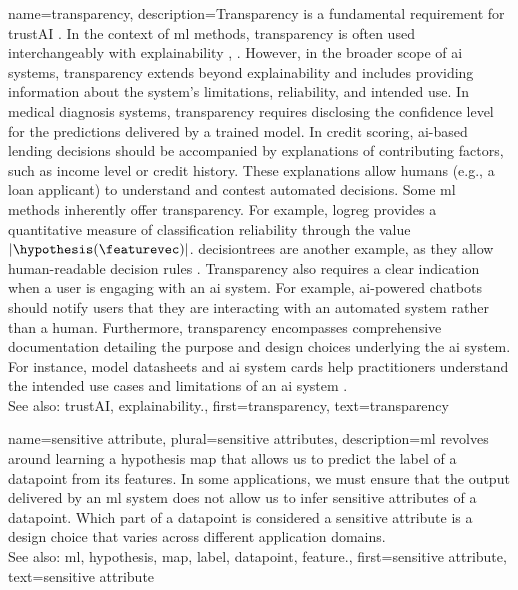 {name={transparency},
	description={Transparency is a fundamental requirement for 
		\gls{trustAI} \cite{HLEGTrustworhtyAI}. In the context of \gls{ml} 
		methods, transparency is often used interchangeably with \gls{explainability} 
		\cite{JunXML2020}, \cite{gallese2023ai}. However, in the broader scope of \gls{ai} 
		systems, transparency extends beyond \gls{explainability} and includes providing information 
		about the system’s limitations, reliability, and intended use. 
		In medical diagnosis systems, transparency requires disclosing the confidence level 
		for the \glspl{prediction} delivered by a trained \gls{model}. In credit scoring, 
		\gls{ai}-based lending decisions should be accompanied by explanations of 
		contributing factors, such as income level or credit history. These explanations 
		allow humans (e.g., a loan applicant) to understand and contest automated decisions. 
		Some \gls{ml} methods inherently offer transparency. For example, \gls{logreg} 
		provides a quantitative measure of \gls{classification} reliability through the value $|\hypothesis(\featurevec)|$. 
		\Glspl{decisiontree} are another example, as they allow human-readable decision rules \cite{rudin2019stop}.
		Transparency also requires a clear indication when a user is engaging with an \gls{ai} system. 
		For example, \gls{ai}-powered chatbots should notify users that they are interacting with an 
		automated system rather than a human. Furthermore, transparency encompasses comprehensive 
		documentation detailing the purpose and design choices underlying the \gls{ai} system. 
		For instance, \gls{model} datasheets \cite{DatasheetData2021} and \gls{ai} system cards \cite{10.1145/3287560.3287596} 
		help practitioners understand the intended use cases and limitations of an \gls{ai} system \cite{Shahriari2017}.
					\\ 
		See also: \gls{trustAI}, \gls{explainability}.},
	first={transparency}, 
	text={transparency} 
}



{name={sensitive attribute}, plural={sensitive attributes},
	description={\gls{ml} revolves around learning a \gls{hypothesis} \gls{map} that allows 
		us to predict the \gls{label} of a \gls{datapoint} from its \glspl{feature}. In some 
		applications, we must ensure that the output delivered by an \gls{ml} system does 
		not allow us to infer sensitive attributes of a \gls{datapoint}. Which part 
		of a \gls{datapoint} is considered a sensitive attribute is a design 
		choice that varies across different application domains.
					\\ 
		See also: \gls{ml}, \gls{hypothesis}, \gls{map}, \gls{label}, \gls{datapoint}, \gls{feature}.},
	first={sensitive attribute},
	text={sensitive attribute} 
}



